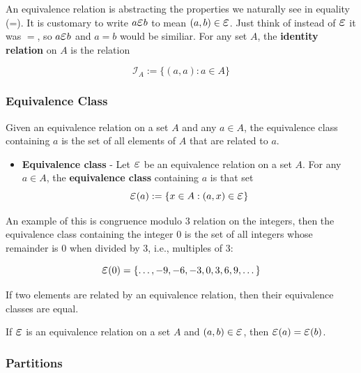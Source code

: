 \documentclass{article}
\begin{document}
An equivalence relation is abstracting the properties we naturally see in equality (=). It is customary to write $a \veps b$ to mean $(a,b) \in \veps$. Just think of instead of $\veps$ it was $=$, so $a \veps b$ and $a = b$ would be similiar. For any set $A$, the \textbf{identity relation} on $A$ is the relation

\begin{equation*}
    \mathcal{I}_{A} := \{(a,a): a \in A\}
\end{equation*}

\subsubsection{Equivalence Class}

Given an equivalence relation on a set $A$ and any $a \in A$, the equivalence class containing $a$ is the set of all elements of $A$ that are related to $a$.

\begin{itemize}
    \item \textbf{Equivalence class} - Let $\veps$ be an equivalence relation on a set $A$. For any $a \in A$, the \textbf{equivalence class} containing $a$ is that set
    \begin{equation*}
        \veps (a) := \{x \in A : (a,x) \in \veps\}
    \end{equation*}
\end{itemize}

An example of this is congruence modulo 3 relation on the integers, then the equivalence class containing the integer $0$ is the set of all integers whose remainder is $0$ when divided by $3$, i.e., multiples of $3$:

\begin{equation*}
    \veps (0) = \{ \dots, -9, -6, -3, 0, 3, 6, 9, \dots \}
\end{equation*}

If two elements are related by an equivalence relation, then their equivalence classes are equal.

\begin{thm}
    If $\veps$ is an equivalence relation on a set $A$ and $(a,b) \in \veps$, then $\veps (a) = \veps (b)$.
\end{thm}

\subsubsection{Partitions}
\end{document}
